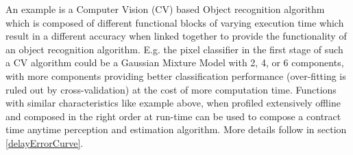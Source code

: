 
An example is a Computer Vision (CV) based Object recognition algorithm which is composed of different functional blocks of varying execution time which result in a different accuracy when linked together to provide the functionality of an object recognition algorithm. E.g. the pixel classifier in the first stage of such a CV algorithm could be a Gaussian Mixture Model with 2, 4, or 6 components, with more components providing better classification performance (over-fitting is ruled out by cross-validation) at the cost of more computation time. Functions with similar characteristics like example above, when profiled extensively offline and composed in the right order at run-time can be used to compose a contract time anytime perception and estimation algorithm. More details follow in section \ref{delayErrorCurve}.







